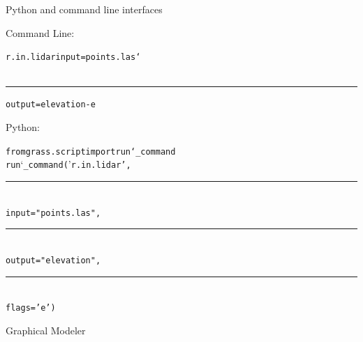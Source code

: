 \documentclass[xcolor={dvipsnames,usenames},beamer,aspectratio=169]{beamer}
\begin{document}
\begin{frame}{Python and command line interfaces}


\Large

Command Line:

\LARGE

\begin{alltt}
\textcolor{mod}{r.in.lidar} \textcolor{opt}{input}=\textcolor{txt}{points.las} \textcolor{bash}{\char`\\}
\\%
\newlength{\shindent}
\settowidth{\shindent}{r.in.lidar~}
\rule{\shindent}{0pt}%
\textcolor{opt}{output}=\textcolor{txt}{elevation} -\textcolor{flg}{e}
\end{alltt}

\Large

Python:


\LARGE

\begin{alltt}
\textcolor{import}{from grass.script import run\char`_command}
\\
run\char`_command('\textcolor{mod}{r.in.lidar}',
%
\newlength{\pyindent}%
\settowidth{\pyindent}{run\_command(}%
\\%
\rule{\pyindent}{0pt}\,%
\textcolor{opt}{input}="\textcolor{txt}{points.las}",
\\%
\rule{\pyindent}{0pt}\,%
\textcolor{opt}{output}="\textcolor{txt}{elevation}",
\\%
\rule{\pyindent}{0pt}\,%
flags='\textcolor{flg}{e}')
\end{alltt}

\end{frame}


\begin{frame}{Graphical Modeler}

\begin{center}
\end{center}

\end{frame}
\end{document}

